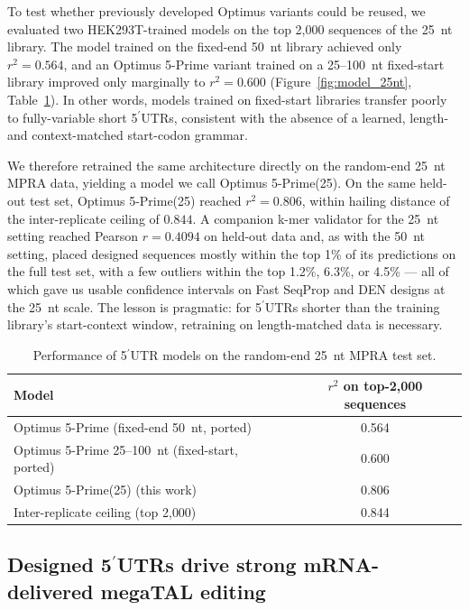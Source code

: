 \documentclass[11pt]{article}
\begin{document}
To test whether previously developed Optimus variants could be reused,
we evaluated two HEK293T-trained models on the top 2{,}000 sequences
of the 25~nt library. The model trained on the fixed-end 50~nt library
achieved only $r^{2} = 0.564$, and an Optimus 5-Prime variant trained
on a 25--100~nt fixed-start library improved only marginally to
$r^{2} = 0.600$ (Figure~\ref{fig:model_25nt},
Table~\ref{tab:model_perf}). In other words, models trained on
fixed-start libraries transfer poorly to fully-variable short
5$^\prime$UTRs, consistent with the absence of a learned, length- and
context-matched start-codon grammar.

We therefore retrained the same architecture directly on the random-end
25~nt MPRA data, yielding a model we call Optimus 5-Prime(25). On the
same held-out test set, Optimus 5-Prime(25) reached $r^{2} = 0.806$,
within hailing distance of the inter-replicate ceiling of $0.844$. A
companion k-mer validator for the 25~nt setting reached Pearson
$r = 0.4094$ on held-out data and, as with the 50~nt setting, placed
designed sequences mostly within the top 1\% of its predictions on the
full test set, with a few outliers within the top 1.2\%, 6.3\%, or 4.5\%
--- all of which gave us usable confidence intervals on Fast SeqProp
and DEN designs at the 25~nt scale. The lesson is pragmatic: for
5$^\prime$UTRs shorter than the training library's start-context window,
retraining on length-matched data is necessary.

\begin{table}[htbp]
\centering
\caption{Performance of 5$^\prime$UTR models on the random-end 25~nt
MPRA test set.}
\label{tab:model_perf}
\begin{tabular}{lc}
\toprule
Model & $r^{2}$ on top-2{,}000 sequences \\
\midrule
Optimus 5-Prime (fixed-end 50~nt, ported) & 0.564 \\
Optimus 5-Prime 25--100~nt (fixed-start, ported) & 0.600 \\
Optimus 5-Prime(25) (this work) & 0.806 \\
\midrule
Inter-replicate ceiling (top 2{,}000) & 0.844 \\
\bottomrule
\end{tabular}
\end{table}

\subsection{Designed 5$^\prime$UTRs drive strong mRNA-delivered megaTAL editing}
\end{document}
